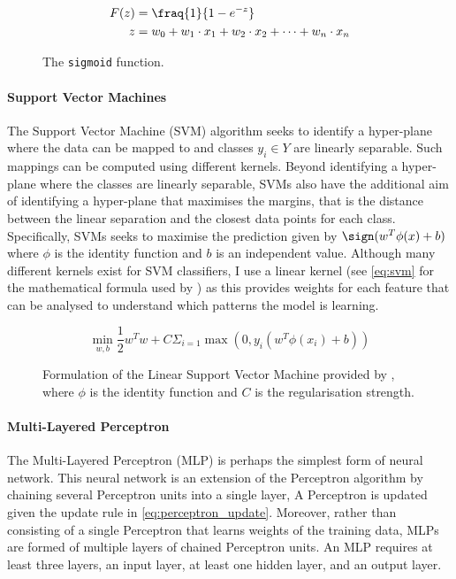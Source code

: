 \begin{figure}[h]
  \begin{align}\label{eq:sigmoid}
    F(z) &= \fraq{1}{1-e^{-z}}\\
    z &= w_0 + w_1 \cdot x_1 + w_2 \cdot x_2 + \cdots + w_n \cdot x_n
  \end{align}
  \caption{The \texttt{sigmoid} function.}
\end{figure}

\paragraph{Support Vector Machines}
The Support Vector Machine (SVM) algorithm seeks to identify a hyper-plane where the data can be mapped to and classes $y_i \in Y$ are linearly separable. Such mappings can be computed using different kernels. Beyond identifying a hyper-plane where the classes are linearly separable, SVMs also have the additional aim of identifying a hyper-plane that maximises the margins, that is the distance between the linear separation and the closest data points for each class. Specifically, SVMs seeks to maximise the prediction given by $\sign(w^T\phi(x)+b)$ where $\phi$ is the identity function and $b$ is an independent value.
Although many different kernels exist for SVM classifiers, I use a linear kernel (see \cref{eq:svm} for the mathematical formula used by \citet{Pedregosa:2011}) as this provides weights for each feature that can be analysed to understand which patterns the model is learning.


\begin{figure}[h]
  \begin{equation}
    \min_{w,b} \frac{1}{2}w^T w + C \Sigma_{i=1}\max(0, y_i(w^T\phi(x_i)+b))
  \end{equation}
  \caption{Formulation of the Linear Support Vector Machine provided by \citet{Pedregosa:2011}, where $\phi$ is the identity function and $C$ is the regularisation strength.}
\end{figure}

\paragraph{Multi-Layered Perceptron}
The Multi-Layered Perceptron (MLP) is perhaps the simplest form of neural network. This neural network is an extension of the Perceptron algorithm by chaining several Perceptron units into a single layer, A Perceptron is updated given the update rule in \autoref{eq:perceptron_update}. Moreover, rather than consisting of a single Perceptron that learns weights of the training data, MLPs are formed of multiple layers of chained Perceptron units. An MLP requires at least three layers, an input layer, at least one hidden layer, and an output layer.


